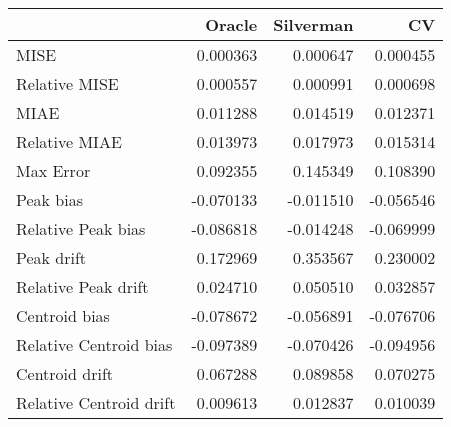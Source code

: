 \begin{tabular}{lrrr}
  \hline
 & Oracle & Silverman & CV \\ 
  \hline
MISE & 0.000363 & 0.000647 & 0.000455 \\ 
  Relative MISE & 0.000557 & 0.000991 & 0.000698 \\ 
  MIAE & 0.011288 & 0.014519 & 0.012371 \\ 
  Relative MIAE & 0.013973 & 0.017973 & 0.015314 \\ 
  Max Error & 0.092355 & 0.145349 & 0.108390 \\ 
  Peak bias & -0.070133 & -0.011510 & -0.056546 \\ 
  Relative Peak bias & -0.086818 & -0.014248 & -0.069999 \\ 
  Peak drift & 0.172969 & 0.353567 & 0.230002 \\ 
  Relative Peak drift & 0.024710 & 0.050510 & 0.032857 \\ 
  Centroid bias & -0.078672 & -0.056891 & -0.076706 \\ 
  Relative Centroid bias & -0.097389 & -0.070426 & -0.094956 \\ 
  Centroid drift & 0.067288 & 0.089858 & 0.070275 \\ 
  Relative Centroid drift & 0.009613 & 0.012837 & 0.010039 \\ 
   \hline
\end{tabular}
